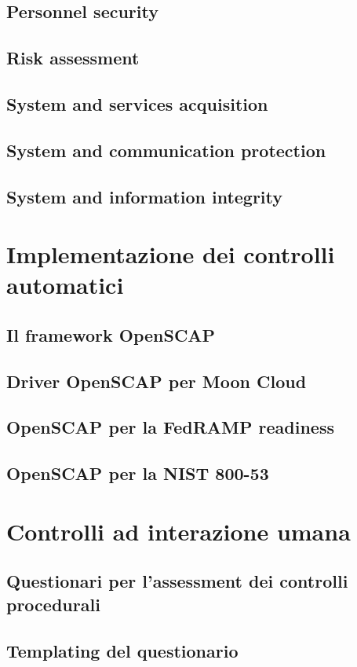 \documentclass[../main.tex]{subfiles}
\begin{document}
\subsection{Personnel security}


\subsection{Risk assessment}


\subsection{System and services acquisition}


\subsection{System and communication protection}


\subsection{System and information integrity}


\section{Implementazione dei controlli automatici}
\subsection{Il framework OpenSCAP}
\subsection{Driver OpenSCAP per Moon Cloud}
\subsection{OpenSCAP per la FedRAMP readiness}
\subsection{OpenSCAP per la NIST 800-53}
\section{Controlli ad interazione umana}
\subsection{Questionari per l'assessment dei controlli procedurali}
\subsection{Templating del questionario}
\end{document}
